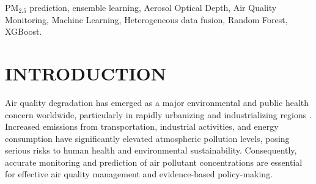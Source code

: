 \documentclass[conference]{IEEEtran}
\begin{document}
\begin{abstract}
Accurate hyper-local estimation of fine particulate matter (PM$_{2.5}$) is essential for effective air quality management but is constrained by the sparse spatial coverage of ground-based monitoring stations. This study proposes an ensemble-based machine learning framework that integrates ground-level PM$_{2.5}$ measurements with satellite-derived Aerosol Optical Depth (AOD), meteorological variables, and geospatial information. Random Forest and XGBoost regressors are employed as complementary base learners, and their predictions are combined using a linear regression--based meta-model to produce final PM$_{2.5}$ estimates. Evaluation on a held-out test set shows that the ensemble model achieves an $R^2$ value of approximately $0.56$, outperforming individual base models and demonstrating the effectiveness of ensemble learning in data-scarce environments. Feature importance analysis highlights the dominant influence of satellite-derived AOD and spatial location. Furthermore, the trained model is deployed as a real-time Flask-based application programming interface (API) that integrates live meteorological data to provide instantaneous PM$_{2.5}$ predictions and corresponding Air Quality Index (AQI) categories, illustrating its practical applicability for hyper-local air quality estimation.
\end{abstract}

\begin{IEEEkeywords}
PM$_{2.5}$ prediction, ensemble learning, Aerosol Optical Depth, Air Quality Monitoring, Machine Learning, Heterogeneous data fusion, Random Forest, XGBoost.
\end{IEEEkeywords}


\section{INTRODUCTION}

Air quality degradation has emerged as a major environmental and public health concern worldwide, particularly in rapidly urbanizing and industrializing regions \cite{b1,b2}. Increased emissions from transportation, industrial activities, and energy consumption have significantly elevated atmospheric pollution levels, posing serious risks to human health and environmental sustainability. Consequently, accurate monitoring and prediction of air pollutant concentrations are essential for effective air quality management and evidence-based policy-making.
\end{document}
